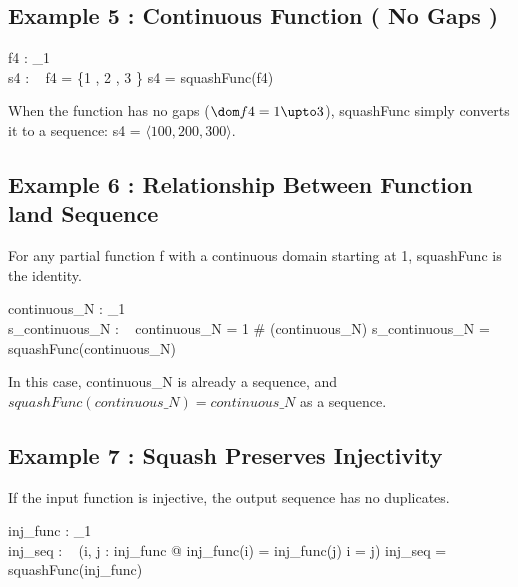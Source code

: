 \documentclass[a4paper,10pt,fleqn]{article}
\begin{document}
\subsection*{Example 5 : Continuous Function ( No Gaps )}

\begin{axdef}
f4 : \nat_1 \pfun \nat \\
s4 : \seq~\nat
\where
f4 = \{1 , 2 , 3 \} \land s4 = squashFunc(f4)
\end{axdef}

\noindent When the function has no gaps ($\dom f4 = 1 \upto 3$), squashFunc simply converts it to a sequence: s4 = $\langle 100, 200, 300 \rangle$.

\bigskip

\subsection*{Example 6 : Relationship Between Function land Sequence}

\noindent For any partial function f with a continuous domain starting at 1, squashFunc is the identity.

\bigskip

\begin{axdef}
continuous\_N : \nat_1 \pfun \nat \\
s\_continuous\_N : \seq~\nat
\where
\dom continuous\_N = 1 \upto \# (\ran continuous\_N) \land s\_continuous\_N = squashFunc(continuous\_N)
\end{axdef}

\noindent In this case, continuous\_N is already a sequence, and $squashFunc(continuous\_N) = continuous\_N$ as a sequence.

\bigskip

\subsection*{Example 7 : Squash Preserves Injectivity}

\noindent If the input function is injective, the output sequence has no duplicates.

\bigskip

\begin{axdef}
inj\_func : \nat_1 \pfun \nat \\
inj\_seq : \seq~\nat
\where
(\forall i, j : \dom inj\_func @ inj\_func(i) = inj\_func(j) \implies i = j) \land inj\_seq = squashFunc(inj\_func)
\end{axdef}
\end{document}
